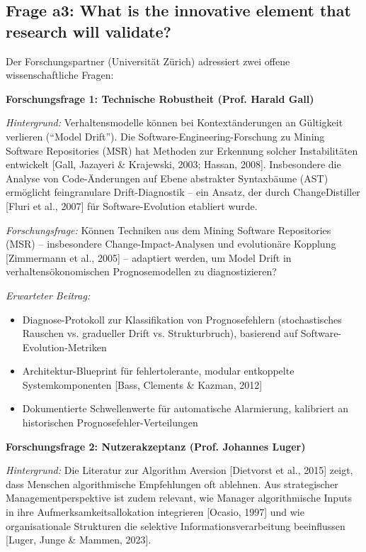 \documentclass[11pt,a4paper]{article}
\newcommand{\evidence}[1]{\textcolor{fehrgray}{[#1]}}
\begin{document}
\subsection{Frage a3: What is the innovative element that research will validate?}

Der Forschungspartner (Universität Zürich) adressiert zwei offene wissenschaftliche Fragen:

\textbf{Forschungsfrage 1: Technische Robustheit (Prof. Harald Gall)}

\textit{Hintergrund:} Verhaltensmodelle können bei Kontextänderungen an Gültigkeit verlieren (``Model Drift''). Die Software-Engineering-Forschung zu Mining Software Repositories (MSR) hat Methoden zur Erkennung solcher Instabilitäten entwickelt \evidence{Gall, Jazayeri \& Krajewski, 2003; Hassan, 2008}. Insbesondere die Analyse von Code-Änderungen auf Ebene abstrakter Syntaxbäume (AST) ermöglicht feingranulare Drift-Diagnostik -- ein Ansatz, der durch ChangeDistiller \evidence{Fluri et al., 2007} für Software-Evolution etabliert wurde.

\textit{Forschungsfrage:} Können Techniken aus dem Mining Software Repositories (MSR) -- insbesondere Change-Impact-Analysen und evolutionäre Kopplung \evidence{Zimmermann et al., 2005} -- adaptiert werden, um Model Drift in verhaltensökonomischen Prognosemodellen zu diagnostizieren?

\textit{Erwarteter Beitrag:}
\begin{itemize}[leftmargin=2em]
    \item Diagnose-Protokoll zur Klassifikation von Prognosefehlern (stochastisches Rauschen vs. gradueller Drift vs. Strukturbruch), basierend auf Software-Evolution-Metriken
    \item Architektur-Blueprint für fehlertolerante, modular entkoppelte Systemkomponenten \evidence{Bass, Clements \& Kazman, 2012}
    \item Dokumentierte Schwellenwerte für automatische Alarmierung, kalibriert an historischen Prognosefehler-Verteilungen
\end{itemize}

\textbf{Forschungsfrage 2: Nutzerakzeptanz (Prof. Johannes Luger)}

\textit{Hintergrund:} Die Literatur zur Algorithm Aversion \evidence{Dietvorst et al., 2015} zeigt, dass Menschen algorithmische Empfehlungen oft ablehnen. Aus strategischer Managementperspektive ist zudem relevant, wie Manager algorithmische Inputs in ihre Aufmerksamkeitsallokation integrieren \evidence{Ocasio, 1997} und wie organisationale Strukturen die selektive Informationsverarbeitung beeinflussen \evidence{Luger, Junge \& Mammen, 2023}.
\end{document}
